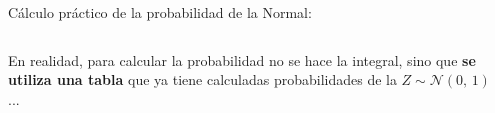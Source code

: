 \documentclass[11pt,handout]{beamer}
\begin{document}
\begin{frame}{Cálculo práctico de la probabilidad de la Normal:}
\begin{columns}
\begin{column}{0.4\textwidth}
\begin{block}{}
En realidad, para calcular la probabilidad no se hace la integral, sino que \textbf{se utiliza una tabla} que ya tiene calculadas probabilidades de la  $Z \sim \mathcal{N}(0,\,1)
    $ ...
\end{block}

\end{column}
\begin{column}{0.6\textwidth}

\end{column}
\end{columns}
\end{frame}
\end{document}
